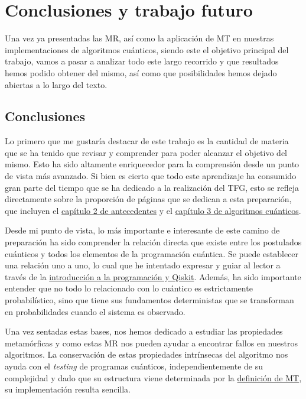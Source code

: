 \cleardoublepage

\chapter{Conclusiones y trabajo futuro}
\label{Cap5:Conclusion}
 Una vez ya presentadas las MR, así como la aplicación de MT en nuestras implementaciones de algoritmos cuánticos, siendo este el objetivo principal del trabajo, vamos a pasar a analizar todo este largo recorrido y que resultados hemos podido obtener del mismo, así como que posibilidades hemos dejado abiertas a lo largo del texto.

 
\section{Conclusiones}
\label{Sec5.1:Conclusion}

Lo primero que me gustaría destacar de este trabajo es la cantidad de materia que se ha tenido que revisar y comprender para poder alcanzar el objetivo del mismo. Esto ha sido altamente enriquecedor para la comprensión desde un punto de vista más avanzado. Si bien es cierto que todo este aprendizaje ha consumido gran parte del tiempo que se ha dedicado a la realización del TFG, esto se refleja directamente sobre la proporción de páginas que se dedican a esta preparación, que incluyen el  \hyperref[Cap2:Antecedentes]{capítulo 2 de antecedentes} y el \hyperref[Cap3:Algoritmos]{capítulo 3 de algoritmos cuánticos}.\newline

Desde mi punto de vista, lo más importante e interesante de este camino de preparación ha sido comprender la relación directa que existe entre los postulados cuánticos y todos los elementos de la programación cuántica. Se puede establecer una relación uno a uno, lo cual que he intentado expresar y guiar al lector a través de la \hyperref[Sec2.3:Qiskit]{introducción a la programación y Qiskit}.  Además, ha sido importante entender que no todo lo relacionado con lo cuántico es estrictamente probabilístico, sino que tiene sus fundamentos deterministas que se transforman en probabilidades cuando el sistema es observado. \newline

Una vez sentadas estas bases, nos hemos dedicado a estudiar las propiedades metamórficas y como estas MR nos pueden ayudar a encontrar fallos en nuestros algoritmos. La conservación de estas propiedades intrínsecas del algoritmo nos ayuda con el \textit{testing} de programas cuánticos, independientemente de su complejidad y dado que su estructura viene determinada por la \hyperref[Def:MT]{definición de MT}, su implementación resulta sencilla.\newline

